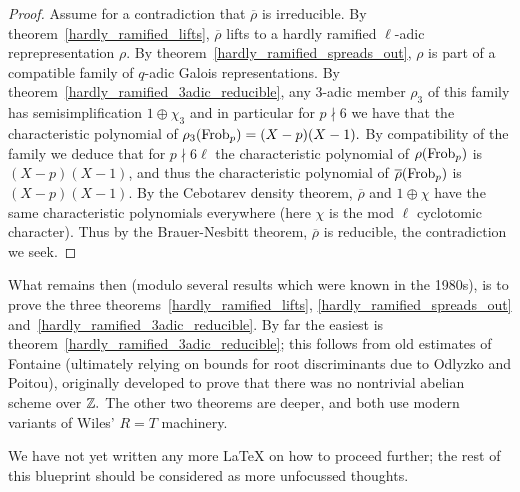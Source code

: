 \begin{proof}
  Assume for a contradiction that $\overline{\rho}$ is irreducible. By theorem~\ref{hardly_ramified_lifts},
  $\overline{\rho}$ lifts to a hardly ramified $\ell$-adic reprepresentation $\rho$. By
  theorem~\ref{hardly_ramified_spreads_out}, $\rho$ is part of a compatible family of
  $q$-adic Galois representations. By theorem~\ref{hardly_ramified_3adic_reducible},
  any 3-adic member $\rho_3$ of this family has semisimplification $1\oplus\chi_3$ and in particular
  for $p\nmid 6$ we have that the characteristic polynomial of $\rho_3(\operatorname{Frob}_p)=(X-p)(X-1).$
  By compatibility of the family we deduce that for $p\nmid 6\ell$ the characteristic
  polynomial of $\rho(\operatorname{Frob}_p)$ is $(X-p)(X-1)$, and thus the characteristic polynomial
  of $\overline{\rho}(\operatorname{Frob}_p)$ is $(X-p)(X-1)$. By the Cebotarev density theorem,
  $\overline{\rho}$ and $1\oplus\chi$ have the same characteristic polynomials everywhere
  (here $\chi$ is the mod $\ell$ cyclotomic character). Thus by the Brauer-Nesbitt theorem,
  $\overline{\rho}$ is reducible, the contradiction we seek.
\end{proof}

What remains then (modulo several results which were known in the 1980s),
is to prove the three theorems~\ref{hardly_ramified_lifts},
\ref{hardly_ramified_spreads_out} and~\ref{hardly_ramified_3adic_reducible}.
By far the easiest is theorem~\ref{hardly_ramified_3adic_reducible}; this follows
from old estimates of Fontaine (ultimately relying on bounds for root discriminants due to
Odlyzko and Poitou), originally developed to prove that there was no
nontrivial abelian scheme over $\mathbb{Z}.$ The other two theorems are deeper, and both use
modern variants of Wiles' $R=T$ machinery.

We have not yet written any more LaTeX on how to proceed further; the rest of
this blueprint should be considered as more unfocussed thoughts.
